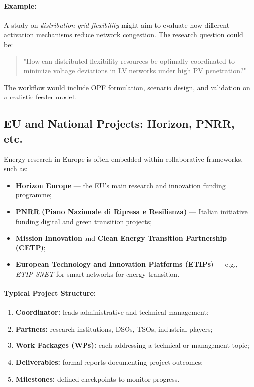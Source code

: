 \documentclass[11pt]{article}
\begin{document}
	\paragraph{Example:}
	A study on \textit{distribution grid flexibility} might aim to evaluate how different activation mechanisms reduce network congestion.  
	The research question could be:
	\begin{quote}
		"How can distributed flexibility resources be optimally coordinated to minimize voltage deviations in LV networks under high PV penetration?"
	\end{quote}
	The workflow would include OPF formulation, scenario design, and validation on a realistic feeder model.
	
	
	\subsection{EU and National Projects: Horizon, PNRR, etc.}
	
	Energy research in Europe is often embedded within collaborative frameworks, such as:
	\begin{itemize}
		\item \textbf{Horizon Europe} — the EU’s main research and innovation funding programme;
		\item \textbf{PNRR (Piano Nazionale di Ripresa e Resilienza)} — Italian initiative funding digital and green transition projects;
		\item \textbf{Mission Innovation} and \textbf{Clean Energy Transition Partnership (CETP)};
		\item \textbf{European Technology and Innovation Platforms (ETIPs)} — e.g., \textit{ETIP SNET} for smart networks for energy transition.
	\end{itemize}
	
	\paragraph{Typical Project Structure:}
	\begin{enumerate}
		\item \textbf{Coordinator:} leads administrative and technical management;
		\item \textbf{Partners:} research institutions, DSOs, TSOs, industrial players;
		\item \textbf{Work Packages (WPs):} each addressing a technical or management topic;
		\item \textbf{Deliverables:} formal reports documenting project outcomes;
		\item \textbf{Milestones:} defined checkpoints to monitor progress.
	\end{enumerate}
	
\end{document}
